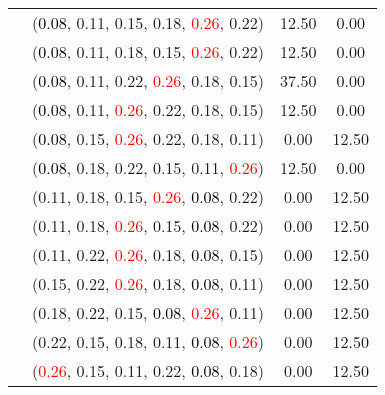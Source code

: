 \documentclass[10pt,a4paper]{report}
\begin{document}
\begin{center}
\begin{longtable}{clcc}
			&(\textcolor{black}{0.08}, 0.11, 0.15, 0.18, \textcolor{red}{0.26}, 0.22)&12.50&0.00\\
			&(\textcolor{black}{0.08}, 0.11, 0.18, 0.15, \textcolor{red}{0.26}, 0.22)&12.50&0.00\\
			&(\textcolor{black}{0.08}, 0.11, 0.22, \textcolor{red}{0.26}, 0.18, 0.15)&37.50&0.00\\
			&(\textcolor{black}{0.08}, 0.11, \textcolor{red}{0.26}, 0.22, 0.18, 0.15)&12.50&0.00\\
			&(\textcolor{black}{0.08}, 0.15, \textcolor{red}{0.26}, 0.22, 0.18, 0.11)&0.00&12.50\\
			&(\textcolor{black}{0.08}, 0.18, 0.22, 0.15, 0.11, \textcolor{red}{0.26})&12.50&0.00\\
			&(0.11, 0.18, 0.15, \textcolor{red}{0.26}, \textcolor{black}{0.08}, 0.22)&0.00&12.50\\
			&(0.11, 0.18, \textcolor{red}{0.26}, 0.15, \textcolor{black}{0.08}, 0.22)&0.00&12.50\\
			&(0.11, 0.22, \textcolor{red}{0.26}, 0.18, \textcolor{black}{0.08}, 0.15)&0.00&12.50\\
			&(0.15, 0.22, \textcolor{red}{0.26}, 0.18, \textcolor{black}{0.08}, 0.11)&0.00&12.50\\
			&(0.18, 0.22, 0.15, \textcolor{black}{0.08}, \textcolor{red}{0.26}, 0.11)&0.00&12.50\\
			&(0.22, 0.15, 0.18, 0.11, \textcolor{black}{0.08}, \textcolor{red}{0.26})&0.00&12.50\\
			&(\textcolor{red}{0.26}, 0.15, 0.11, 0.22, \textcolor{black}{0.08}, 0.18)&0.00&12.50\\
		\bottomrule
	\end{longtable}
\end{center}
\end{document}
